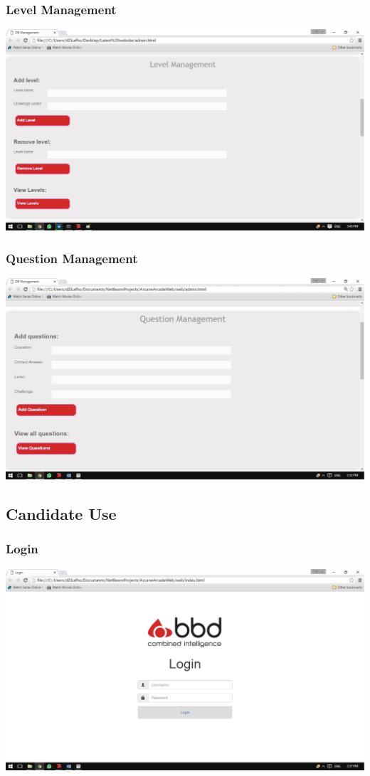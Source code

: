 \documentclass[english]{article}
\begin{document}
			\subsubsection{Level Management}
				\includegraphics[width=\linewidth]{levelManagement.jpg}
			\subsubsection{Question Management}
				\includegraphics[width=\linewidth]{QuestionManagement.jpg}
			
		\subsection{Candidate Use}
			\subsubsection{Login}
				\includegraphics[width=\linewidth]{Login.jpg}
\end{document}
